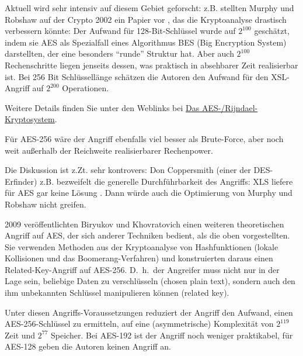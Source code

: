Aktuell wird sehr intensiv auf diesem Gebiet geforscht: z.B. stellten
Murphy und Robshaw auf der Crypto 2002 ein Papier vor \cite{Robshaw2002a},
das die Kryptoanalyse drastisch verbessern könnte: Der Aufwand für
128-Bit-Schlüssel wurde auf $2^{100}$ geschätzt, indem sie AES als
Spezialfall eines Algorithmus BES (Big Encryption System) darstellten,
der eine besonders "`runde"' Struktur hat. Aber auch $2^{100}$
Rechenschritte liegen jenseits dessen, was praktisch in absehbarer Zeit
realisierbar ist. Bei 256 Bit Schlüssellänge schätzen die Autoren
den Aufwand für den XSL-Angriff auf $2^{200}$ Operationen.

Weitere Details finden Sie unter den Weblinks bei
\hyperlink{CM_HT_Weblink_Rijndael-Cryptosystem}{\glqq Das AES-/Rijndael-Kryptosystem\grqq}.


Für AES-256 wäre der Angriff ebenfalls viel besser als
Brute-Force, aber noch weit außerhalb der
Reichweite realisierbarer Rechenpower.

\begin{sloppypar}
Die Diskussion ist z.Zt. sehr kontrovers: Don Coppersmith (einer der
DES-Erfinder) z.B. bezweifelt die generelle Durchführbarkeit des Angriffs:
XLS liefere für AES gar keine Lösung \cite{Coppersmith2002}. Dann würde
auch die Optimierung von Murphy und Robshaw \cite{Robshaw2002b} nicht
greifen.
\end{sloppypar}

2009 veröffentlichten Biryukov und Khovratovich \cite{Biryukov2009} einen
weiteren theoretischen Angriff auf AES, der sich anderer Techniken bedient, als
die oben vorgestellten. Sie verwenden Methoden aus der Kryptoanalyse von
Hashfunktionen (lokale Kollisionen und das Boomerang-Verfahren) und
konstruierten daraus einen Related-Key-Angriff auf AES-256. D.~h.\ der Angreifer
muss nicht nur in der Lage sein, beliebige Daten zu verschlüsseln (chosen plain
text), sondern auch den ihm unbekannten Schlüssel manipulieren können (related
key).

Unter diesen Angriffs-Voraussetzungen reduziert der Angriff den Aufwand, einen
AES-256-Schlüssel zu ermitteln, auf eine (asymmetrische) Komplexität von
$2^{119}$ Zeit und $2^{77}$ Speicher. Bei AES-192 ist der Angriff noch weniger
praktikabel, für AES-128 geben die Autoren keinen Angriff an.


